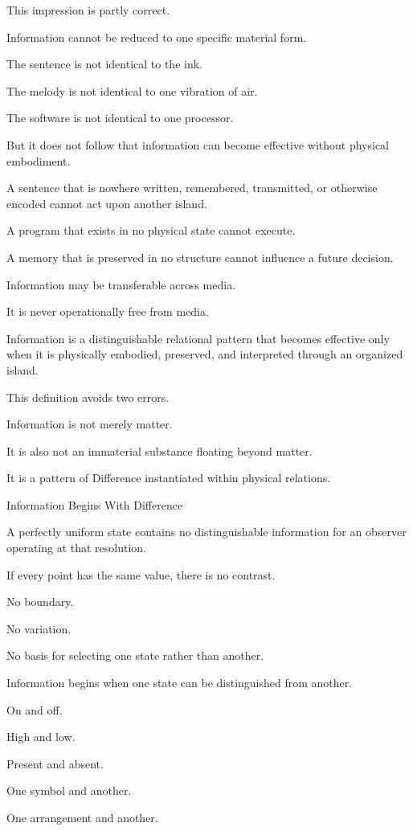 This impression is partly correct.

Information cannot be reduced to one specific material form.

The sentence is not identical to the ink.

The melody is not identical to one vibration of air.

The software is not identical to one processor.

But it does not follow that information can become effective without physical embodiment.

A sentence that is nowhere written, remembered, transmitted, or otherwise encoded cannot act upon another island.

A program that exists in no physical state cannot execute.

A memory that is preserved in no structure cannot influence a future decision.

Information may be transferable across media.

It is never operationally free from media.

Information is a distinguishable relational pattern that becomes effective only when it is physically embodied, preserved, and interpreted through an organized island.

This definition avoids two errors.

Information is not merely matter.

It is also not an immaterial substance floating beyond matter.

It is a pattern of Difference instantiated within physical relations.

Information Begins With Difference

A perfectly uniform state contains no distinguishable information for an observer operating at that resolution.

If every point has the same value, there is no contrast.

No boundary.

No variation.

No basis for selecting one state rather than another.

Information begins when one state can be distinguished from another.

On and off.

High and low.

Present and absent.

One symbol and another.

One arrangement and another.

